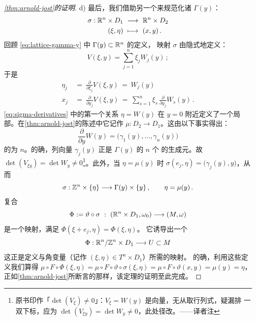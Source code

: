 \begin{proof}[\cref*{thm:arnold-jost}的证明]
d) 最后，我们借助另一个\trSymplecticDiffeomorphism{}来规范化诸\trLattice{} $\Gamma(y)$：
\begin{align*}
\sigma:\mathbb{R}^{n}\times D_{1}\ &\longrightarrow\ \mathbb{R}^{n}\times D_{2}\\
(\xi,\eta)\ &\longmapsto\ (x,y)\,.
\end{align*}
回顾 \eqref{eq:lattice-gamma-y} 中\trLattice{} $\Gamma(y)\subset\mathbb{R}^{n}$ 的定义，%
\trSymplectic{}映射 $\sigma$ 由\trGeneratingFunction{}隐式地定义：
\begin{equation}\label{eq:sigma-generating}
V(\xi,y)=\sum_{j=1}^{n}\xi_{j}W_{j}(y)\,;
\end{equation}
于是
\begin{equation}\label{eq:sigma-derivatives}
\begin{aligned}
\eta_{j}\ &=\ \frac{\partial}{\partial\xi_{j}}V(\xi,y)\ =\ W_{j}(y)\\
x_{j}\ &=\ \frac{\partial}{\partial y_{j}}V(\xi,y)\ =\ \sum_{s=1}^{n}\xi_{s}\,%
\frac{\partial}{\partial y_{j}}W_{s}(y)\,.
\end{aligned}
\end{equation}
\eqref{eq:sigma-derivatives} 中的第一个关系 $\eta=W(y)$ 在\trFixedPoint{} $y=0$%
附近定义了一个局部\trDiffeomorphism。在\cref*{thm:arnold-jost}的陈述中它记作%
$\mu:D_{2}\to D_{1}$。这由以下事实得出：
\[
\frac{\partial}{\partial y}W(y)=\bigl(\gamma_{1}(y),\dots,\gamma_{n}(y)\bigr)
\]
的\trRank{}为 $n$。的确，列向量 $\gamma_{j}(y)$ 正是 $\Gamma(y)$ 的 $n$ 个%
\trLinearlyIndependent{}的生成元。故 $\det(V_{\xi y})=\det W_{y}\neq0$\footnote{%
原书印作「$\det(V_{\xi})\neq0$」：$V_{\xi}=W(y)$ 是向量，无从取行列式，疑漏排%
一双下标，应为 $\det(V_{\xi y})=\det W_{y}\neq0$，此处径改。——译者注}。此外，当 $\eta=\mu(y)$%
时 $\sigma(e_{j},\eta)=\bigl(\gamma_{j}(y),y\bigr)$，从而
\[
\sigma:\Z^{n}\times\{\eta\}\longrightarrow\Gamma(y)\times\{y\}\,,%
\qquad \eta=\mu(y)\,.
\]
复合
\[
\Phi:=\vartheta\circ\sigma\ :\ (\R^{n}\times D_{1},\omega_{0})%
\longrightarrow(M,\omega)
\]
是一个\trSymplectic{}映射，满足 $\Phi(\xi+e_{j},\eta)=\Phi(\xi,\eta)$。%
它诱导出一个\trSymplecticDiffeomorphism
\[
\Phi:\mathbb{R}^{n}/\mathbb{Z}^{n}\times D_{1}\longrightarrow U\subset M
\]
这正是定义\trAction{}与角变量（记作 $(\xi,\eta)\in T^{n}\times D_{1}$）所需的映射。%
的确，利用这些定义我们算得 $\mu\circ F\circ\Phi(\xi,\eta)=%
\mu\circ F\circ\vartheta\circ\sigma(\xi,\eta)=\mu\circ F\circ\vartheta(x,y)=%
\mu(y)=\eta$，正如\cref*{thm:arnold-jost}所断言的那样，该定理的证明至此完成。
\end{proof}

